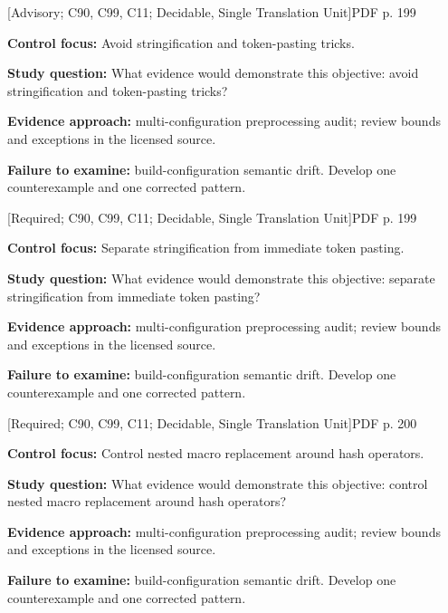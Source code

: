\documentclass[10pt,letterpaper]{article}
\begin{document}
\smallskip
{}
 \textsf{\footnotesize [Advisory; C90, C99, C11; Decidable, Single Translation Unit]}\hfill{\footnotesize PDF p. 199}\par
\textbf{Control focus:} Avoid stringification and token-pasting tricks.\par
\textbf{Study question:} What evidence would demonstrate this objective: avoid stringification and token-pasting tricks?\par
\textbf{Evidence approach:} multi-configuration preprocessing audit; review bounds and exceptions in the licensed source.\par
\textbf{Failure to examine:} build-configuration semantic drift. Develop one counterexample and one corrected pattern.\par
\smallskip
{}
 \textsf{\footnotesize [Required; C90, C99, C11; Decidable, Single Translation Unit]}\hfill{\footnotesize PDF p. 199}\par
\textbf{Control focus:} Separate stringification from immediate token pasting.\par
\textbf{Study question:} What evidence would demonstrate this objective: separate stringification from immediate token pasting?\par
\textbf{Evidence approach:} multi-configuration preprocessing audit; review bounds and exceptions in the licensed source.\par
\textbf{Failure to examine:} build-configuration semantic drift. Develop one counterexample and one corrected pattern.\par
\smallskip
{}
 \textsf{\footnotesize [Required; C90, C99, C11; Decidable, Single Translation Unit]}\hfill{\footnotesize PDF p. 200}\par
\textbf{Control focus:} Control nested macro replacement around hash operators.\par
\textbf{Study question:} What evidence would demonstrate this objective: control nested macro replacement around hash operators?\par
\textbf{Evidence approach:} multi-configuration preprocessing audit; review bounds and exceptions in the licensed source.\par
\textbf{Failure to examine:} build-configuration semantic drift. Develop one counterexample and one corrected pattern.\par
\smallskip
\end{document}
